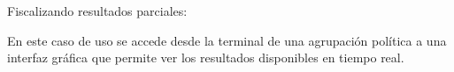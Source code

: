 \bigskip

Fiscalizando resultados parciales:

En este caso de uso se accede desde la terminal de una agrupación política a una interfaz gráfica que permite ver los resultados disponibles en tiempo real.












